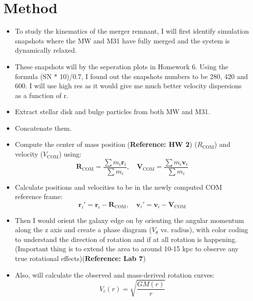 \documentclass{article}
\begin{document}
\section{Method}
\label{sec:method}

\begin{itemize}
    \item To study the kinematics of the merger remnant, I will first identify simulation snapshots where the MW and M31 have fully merged and the system is dynamically relaxed.
    \item These snapshots will by the seperation plots in Homework 6. Using the formula (SN * 10)/0.7, I found out the snapshots numbers to be 280, 420 and 600. I will use high res as it would give me much better velocity dispersions as a function of r.
    
\end{itemize}
\begin{itemize}
    \item Extract stellar disk and bulge particles from both MW and M31.
    \item Concatenate them. 
\end{itemize} 

\begin{itemize}
    \item Compute the center of mass position  (\textbf{Reference: HW 2}) ($R_{\text{COM}}$) and velocity ($V_{\text{COM}}$) using:
    \begin{equation}
        \mathbf{R}_{\text{COM}} = \frac{\sum m_i \mathbf{r}_i}{\sum m_i}, \quad \mathbf{V}_{\text{COM}} = \frac{\sum m_i \mathbf{v}_i}{\sum m_i}
    \end{equation}
    \item Calculate positions and velocities to be in  the newly computed COM reference frame:
    \begin{equation}
        \mathbf{r}_i' = \mathbf{r}_i - \mathbf{R}_{\text{COM}}, \quad \mathbf{v}_i' = \mathbf{v}_i - \mathbf{V}_{\text{COM}}
    \end{equation}
    \item Then I would orient the galaxy edge on by orienting the angular momentum along the z axis and  create a phase diagram ($V_{\theta}$ vs. radius), with color coding to understand the direction of rotation and if at all rotation is happening. (Important thing is to extend the area to around 10-15 kpc to observe any true rotational effects)(\textbf{Reference: Lab 7})
    
    \item Also, will calculate  the observed and mass-derived rotation curves:
    \begin{equation}
        V_{c}(r) = \sqrt{\frac{G M(r)}{r}}
    \end{equation}
\end{itemize}
\end{document}
